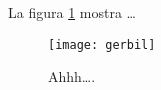 \documentclass{article}
\begin{document}
La figura \ref{fig:gerbil} mostra \ldots
\begin{figure}
\centering
\texttt{[image: gerbil]}
\caption{\label{fig:gerbil}Ahhh\ldots.}
\end{figure}
\end{document}
